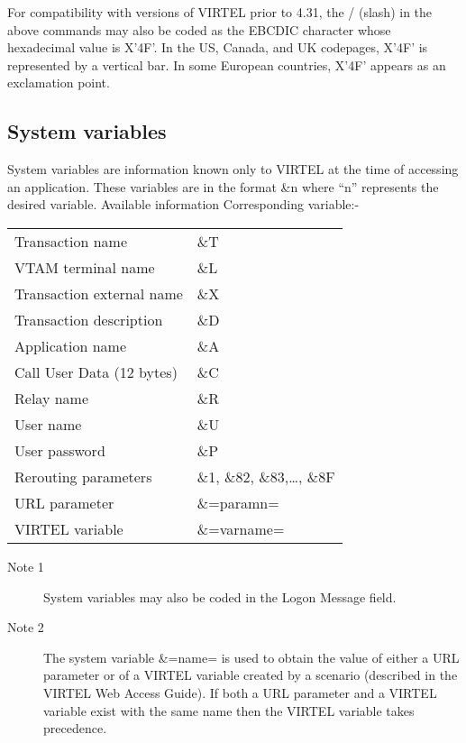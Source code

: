 \documentclass[letterpaper,10pt,english]{sphinxmanual}
\begin{document}
For compatibility with versions of VIRTEL prior to 4.31, the / (slash) in the above commands may also be coded as the EBCDIC character whose hexadecimal value is X’4F’. In the US, Canada, and UK codepages, X’4F’ is represented by a vertical bar. In some European countries, X’4F’ appears as an exclamation point.


\subsection{System variables}
\label{\detokenize{connectivity_guide:index-119}}\label{\detokenize{connectivity_guide:system-variables}}
System variables are information known only to VIRTEL at the time of accessing an application. These variables are in the format \&n where “n” represents the desired variable.
Available information Corresponding variable:-


\begin{savenotes}\sphinxattablestart
\centering
\begin{tabulary}{\linewidth}[t]{|T|T|}
\hline
{}\relax &\relax \\
\hline
Transaction name
&
\&T
\\
\hline
VTAM terminal name
&
\&L
\\
\hline
Transaction external name
&
\&X
\\
\hline
Transaction description
&
\&D
\\
\hline
Application name
&
\&A
\\
\hline
Call User Data (12 bytes)
&
\&C
\\
\hline
Relay name
&
\&R
\\
\hline
User name
&
\&U
\\
\hline
User password
&
\&P
\\
\hline
Rerouting parameters
&
\&1, \&82, \&83,…, \&8F
\\
\hline
URL parameter
&
\&=paramn=
\\
\hline
VIRTEL variable
&
\&=varname=
\\
\hline
\end{tabulary}
\par
\sphinxattableend\end{savenotes}
\begin{description}
\item[{Note 1}] \leavevmode
System variables may also be coded in the Logon Message field.

\item[{Note 2}] \leavevmode
The system variable \&=name= is used to obtain the value of either a URL parameter or of a VIRTEL variable created by a scenario (described in the VIRTEL Web Access Guide). If both a URL parameter and a VIRTEL variable exist with the same name then the VIRTEL variable takes precedence.

\end{description}
\end{document}
